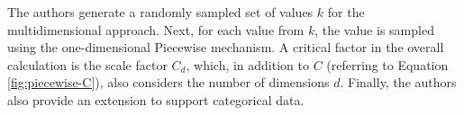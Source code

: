 
The authors generate a randomly sampled set of values $k$ for the multidimensional approach.
Next, for each value from $k$, the value is sampled using the one-dimensional Piecewise mechanism.
A critical factor in the overall calculation is the scale factor $C_d$, which, in addition to $C$ (referring to Equation \ref{fig:piecewise-C}), also considers the number of dimensions $d$.
Finally, the authors also provide an extension to support categorical data.


